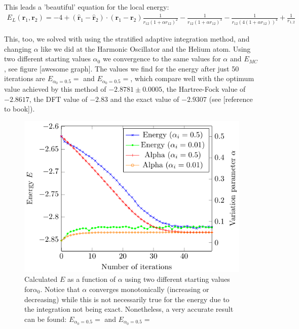 This leads a 'beautiful' equation for the local energy:
  \begin{align}
    E_L(\textbf{r}_1,\textbf{r}_2) = -4  + (\hat{\textbf{r}}_1 - \hat{\textbf{r}}_2) \cdot (\textbf{r}_1 - \textbf{r}_2) \frac{1}{r_{12}(1+\alpha r_{12})^2} -  \frac{1}{r_{12}(1+\alpha r_{12})^3} - \frac{1}{r_{12}(4(1+\alpha r_{12}))^4} + \frac{1}{r_{1,2}}   \end{align}
  
This, too, we solved with using the stratified adaptive integration method, and changing $\alpha$ like we did at the Harmonic Oscillator and the Helium atom. Using two different starting values $\alpha_0$ we convergence to the same values for $\alpha$ and $E_{MC}$, see figure [awesome graph]. The values we find for the energy after just 50 iterations are $E_{\alpha_0 = 0.5} =  $ and $E_{\alpha_0 = 0.5} =  $, which compare well with the optimum value achieved by this method of $-2.8781 \pm 0.0005$, the Hartree-Fock value of $-2.8617$, the DFT value of $-2.83$ and the exact value of $-2.9307$ (see [reference to book]). 

\begin{figure}
  \begin{center}
  \includegraphics[scale=1 ]{graphs/he-e-alpha-iterations.pdf}
  \caption{Calculated $E$ as a function of $\alpha$ using two different starting values for$\alpha_0$. Notice that $\alpha$ converges monotonically (increasing or decreasing) while this is not necessarily true for the energy due to the integration not being exact. Nonetheless, a very accurate result can be found: $E_{\alpha_0 = 0.5} =  $ and $E_{\alpha_0 = 0.5} =  $}
  \label{fig:He_it}
  \end{center}
\end{figure}
 
